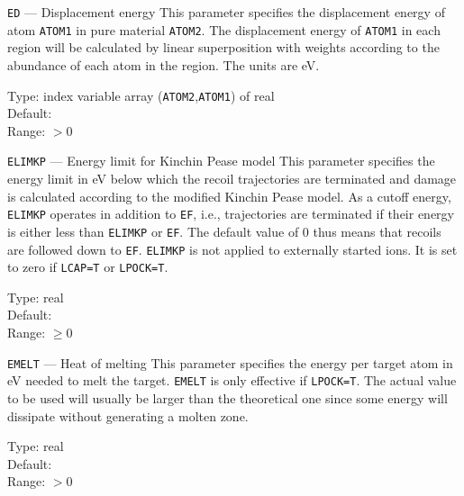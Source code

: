 \begin{keydescription}{\texttt{ED} --- Displacement energy}
%
  This parameter specifies the displacement energy of atom
  \texttt{ATOM1} in pure material \texttt{ATOM2}.  The displacement energy
  of \texttt{ATOM1} in each region will be calculated by linear superposition
  with weights according to the abundance of each atom in the region. The
  units are eV. 
  \begin{keytab}
    Type:    \> index variable array (\texttt{ATOM2},\texttt{ATOM1}) 
                of real \\
    Default:  \\
    Range:   \> $> 0$
  \end{keytab}
\end{keydescription}

\begin{keydescription}{\texttt{ELIMKP} --- Energy limit for Kinchin
    Pease model}
%
  This parameter specifies the energy limit in eV below which the
  recoil trajectories are terminated and damage is calculated according to the 
  modified Kinchin Pease model. As a cutoff energy, \texttt{ELIMKP} operates 
  in addition to \texttt{EF},
  i.e., trajectories are terminated if their energy is either less than 
  \texttt{ELIMKP} or \texttt{EF}. The default value of 0 thus means that 
  recoils are followed down to \texttt{EF}. \texttt{ELIMKP} is not applied to 
  externally started ions. It is set to zero if \texttt{LCAP=T} or 
  \texttt{LPOCK=T}. 
  \begin{keytab}
    Type:    \> real \\
    Default:  \\
    Range:   \> $\ge 0$
  \end{keytab}
\end{keydescription}

\begin{keydescription}{\texttt{EMELT} --- Heat of melting}
%
  This parameter specifies the energy per target atom in eV needed to
  melt the target. \texttt{EMELT} is only effective if
  \texttt{LPOCK=T}. The actual value to be used will usually be larger
  than the theoretical one since some energy will dissipate without
  generating a molten zone.
  \begin{keytab}
    Type:    \> real \\
    Default:  \\
    Range:   \> $> 0$
  \end{keytab}
\end{keydescription}


